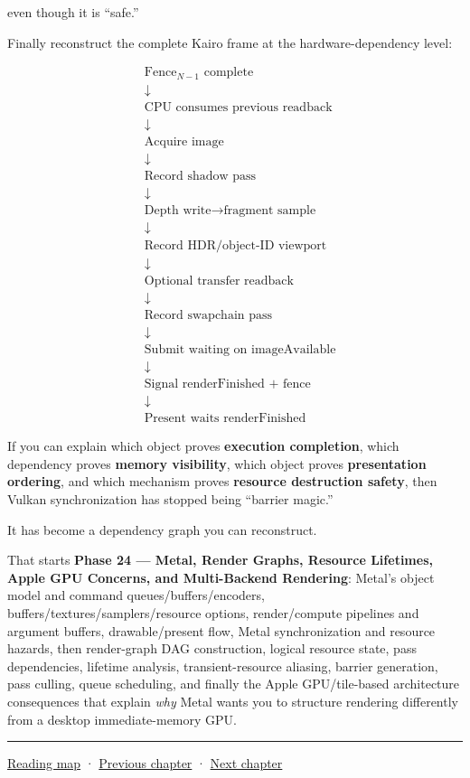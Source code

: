 even though it is ``safe.''

Finally reconstruct the complete Kairo frame at the hardware-dependency level:

\[
\boxed{
\begin{aligned}
&\text{Fence}_{N-1}\text{ complete}\\
&\downarrow\\
&\text{CPU consumes previous readback}\\
&\downarrow\\
&\text{Acquire image}\\
&\downarrow\\
&\text{Record shadow pass}\\
&\downarrow\\
&\text{Depth write}\rightarrow\text{fragment sample}\\
&\downarrow\\
&\text{Record HDR/object-ID viewport}\\
&\downarrow\\
&\text{Optional transfer readback}\\
&\downarrow\\
&\text{Record swapchain pass}\\
&\downarrow\\
&\text{Submit waiting on imageAvailable}\\
&\downarrow\\
&\text{Signal renderFinished + fence}\\
&\downarrow\\
&\text{Present waits renderFinished}
\end{aligned}
}
\]

If you can explain which object proves \textbf{execution completion}, which dependency proves \textbf{memory visibility}, which object proves \textbf{presentation ordering}, and which mechanism proves \textbf{resource destruction safety}, then Vulkan synchronization has stopped being ``barrier magic.''

It has become a dependency graph you can reconstruct.

That starts \textbf{Phase 24 --- Metal, Render Graphs, Resource Lifetimes, Apple GPU Concerns, and Multi-Backend Rendering}: Metal's object model and command queues/buffers/encoders, buffers/textures/samplers/resource options, render/compute pipelines and argument buffers, drawable/present flow, Metal synchronization and resource hazards, then render-graph DAG construction, logical resource state, pass dependencies, lifetime analysis, transient-resource aliasing, barrier generation, pass culling, queue scheduling, and finally the Apple GPU/tile-based architecture consequences that explain \emph{why} Metal wants you to structure rendering differently from a desktop immediate-memory GPU.

\begin{center}\rule{0.5\linewidth}{0.5pt}\end{center}

\hyperref[volume-reading-map]{Reading map} · \hyperref[01-foundations-i-ch013-open-vulkan-devices-and-describe-resources]{Previous chapter} · \hyperref[01-foundations-i-ch015-execute-and-measure-a-metal-frame]{Next chapter}
